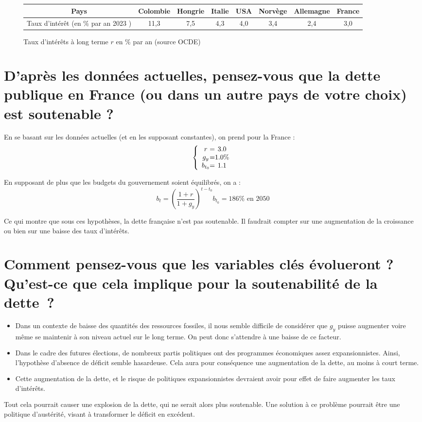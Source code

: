 \documentclass{article}
\begin{document}
\begin{figure}[h!]
    \centering
    \begin{tabular}{ | c | c | c |  c |  c |  c |  c |  c | }
      \hline
      Pays & Colombie & Hongrie & Italie & USA  & Norvège & Allemagne & France \\ \hline
      Taux d'intérêt (en \% par an 2023 ) & 11,3 & 7,5 & 4,3 & 4,0 & 3,4 & 2,4 & 3,0 \\ \hline
    \end{tabular}
    \caption{Taux d'intérêts à long terme $r$ en \% par an (source OCDE)}
\end{figure}
    
\clearpage

\section{D’après les données actuelles, pensez-vous que la dette publique en France (ou dans un autre pays
de votre choix) est soutenable ?}

En se basant sur les données actuelles (et en les supposant constantes), on prend pour la France :
\[
\left \{
\begin{array}{c @{=} c}
    r & 3.0 \\
    g_y & 1.0 \% \\
    b_{t_0} & 1.1
 \end{array}
\right.
\]

En supposant de plus que les budgets du gouvernement soient équilibrés, on a :
$$b_t = (\frac{1 + r}{1 + g_y})^{t-t_0}b_{t_0} = 186 \% \text{ en 2050}$$

Ce qui montre que sous ces hypothèses, la dette française n'est pas soutenable. Il faudrait compter sur une augmentation de la croissance ou bien sur une baisse des taux d'intérêts. 

\section{Comment pensez-vous que les variables clés évolueront ? Qu’est-ce que cela implique pour la
soutenabilité de la dette~?}

\begin{itemize}
  \item Dans un contexte de baisse des quantités des ressources fossiles, il nous semble difficile de considérer que $g_y$ puisse augmenter voire même se maintenir à son niveau actuel sur le long terme. On peut donc s'attendre à une baisse de ce facteur.
  \item Dans le cadre des futures élections, de nombreux partis politiques ont des programmes économiques assez expansionnistes. Ainsi, l'hypothèse d'absence de déficit semble hasardeuse. Cela aura pour conséquence une augmentation de la dette, au moins à court terme.
  \item Cette augmentation de la dette, et le risque de politiques expansionnistes devraient avoir pour effet de faire augmenter les taux d'intérêts.
\end{itemize}

Tout cela pourrait causer une explosion de la dette, qui ne serait alors plus soutenable. Une solution à ce problème pourrait être une politique d'austérité, visant à transformer le déficit en excédent. 
\end{document}
